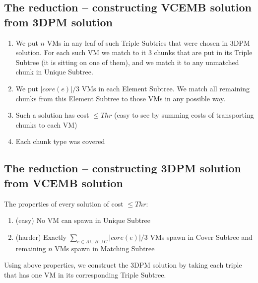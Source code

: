 \subsection{The reduction -- constructing VCEMB solution from 3DPM
  solution}

\begin{enumerate}
  \item We put $n$ VMs in any leaf of such Triple Subtries that were
  chosen in 3DPM solution. For each such VM we match to it 3 chunks
  that are put in its Triple Subtree (it is sitting on one of them),
  and we match it to any unmatched chunk in Unique Subtree.
  \item We put $|core(e)|/3$ VMs in each Element Subtree. We match all remaining
  chunks from this Element Subtree to those VMs in any possible
  way.
  \item Such a solution has cost $\leq Thr$ (easy to see by
  summing costs of transporting chunks to each VM)
  \item Each chunk type was covered
\end{enumerate}

\subsection{The reduction -- constructing 3DPM solution from VCEMB solution}

The properties of every solution of cost $\leq Thr$:
\begin{enumerate}
  \item (easy) No VM can spawn in Unique Subtree
  \item (harder) Exactly $\sum_{e\in A\cup B\cup C}|core(e)|/3$ VMs
  spawn in Cover Subtree and remaining $n$ VMs spawn in Matching
  Subtree
\end{enumerate}

Using above properties, we construct the 3DPM solution by taking each
triple that has one VM in its corresponding Triple Subtree.